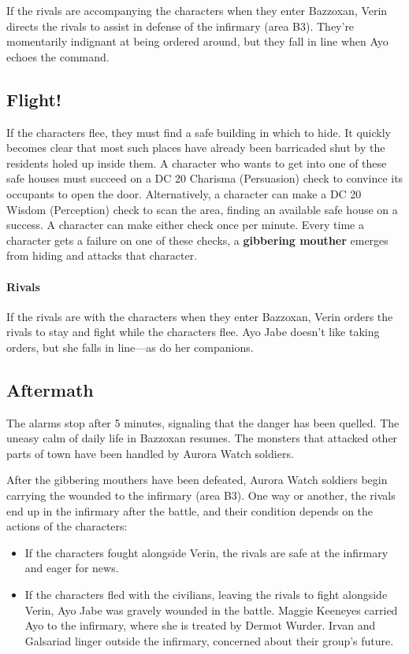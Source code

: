 \documentclass[a4paper, 11pt, bg=full, twocolumn, nooutline]{dndbook}
\begin{document}
If the rivals are accompanying the characters when they enter Bazzoxan, Verin directs the rivals to assist in defense of the infirmary (area B3). They're momentarily indignant at being ordered around, but they fall in line when Ayo echoes the command.

\subsection{Flight!}

If the characters flee, they must find a safe building in which to hide. It quickly becomes clear that most such places have already been barricaded shut by the residents holed up inside them. A character who wants to get into one of these safe houses must succeed on a DC 20 Charisma (Persuasion) check to convince its occupants to open the door. Alternatively, a character can make a DC 20 Wisdom (Perception) check to scan the area, finding an available safe house on a success. A character can make either check once per minute. Every time a character gets a failure on one of these checks, a \textbf{gibbering mouther} emerges from hiding and attacks that character.

\paragraph{Rivals}

If the rivals are with the characters when they enter Bazzoxan, Verin orders the rivals to stay and fight while the characters flee. Ayo Jabe doesn't like taking orders, but she falls in line---as do her companions.

\subsection{Aftermath}

The alarms stop after 5 minutes, signaling that the danger has been quelled. The uneasy calm of daily life in Bazzoxan resumes. The monsters that attacked other parts of town have been handled by Aurora Watch soldiers.

After the gibbering mouthers have been defeated, Aurora Watch soldiers begin carrying the wounded to the infirmary (area B3). One way or another, the rivals end up in the infirmary after the battle, and their condition depends on the actions of the characters:

\begin{itemize}
\item If the characters fought alongside Verin, the rivals are safe at the infirmary and eager for news.
\item If the characters fled with the civilians, leaving the rivals to fight alongside Verin, Ayo Jabe was gravely wounded in the battle. Maggie Keeneyes carried Ayo to the infirmary, where she is treated by Dermot Wurder. Irvan and Galsariad linger outside the infirmary, concerned about their group's future.
\end{itemize}
\end{document}
